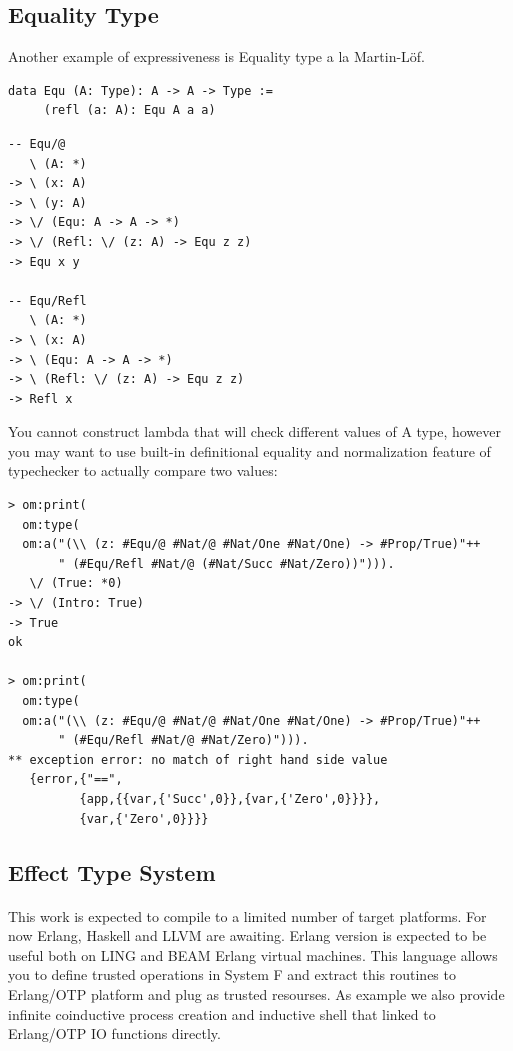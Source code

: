 \documentclass[11pt,oneside]{article}
\begin{document}
\newpage
\subsection{Equality Type}

Another example of expressiveness is Equality type a la Martin-Löf.

\begin{lstlisting}[mathescape=true]
data Equ (A: Type): A -> A -> Type :=
     (refl (a: A): Equ A a a)
\end{lstlisting}

\begin{lstlisting}[mathescape=true]
-- Equ/@
   \ (A: *)
-> \ (x: A)
-> \ (y: A)
-> \/ (Equ: A -> A -> *)
-> \/ (Refl: \/ (z: A) -> Equ z z)
-> Equ x y

-- Equ/Refl
   \ (A: *)
-> \ (x: A)
-> \ (Equ: A -> A -> *)
-> \ (Refl: \/ (z: A) -> Equ z z)
-> Refl x
\end{lstlisting}

You cannot construct lambda that will check different values of A type,
however you may want to use built-in definitional equality and
normalization feature of typechecker to actually compare two values:

\begin{lstlisting}[mathescape=true]
> om:print(
  om:type(
  om:a("(\\ (z: #Equ/@ #Nat/@ #Nat/One #Nat/One) -> #Prop/True)"++
       " (#Equ/Refl #Nat/@ (#Nat/Succ #Nat/Zero))"))).
   \/ (True: *0)
-> \/ (Intro: True)
-> True
ok

> om:print(
  om:type(
  om:a("(\\ (z: #Equ/@ #Nat/@ #Nat/One #Nat/One) -> #Prop/True)"++
       " (#Equ/Refl #Nat/@ #Nat/Zero)"))).
** exception error: no match of right hand side value
   {error,{"==",
          {app,{{var,{'Succ',0}},{var,{'Zero',0}}}},
          {var,{'Zero',0}}}}
\end{lstlisting}

\newpage
\subsection{Effect Type System}

\paragraph{}
This work is expected to compile to a limited number of target platforms. For now Erlang, Haskell and LLVM are awaiting.
Erlang version is expected to be useful both on LING and BEAM Erlang virtual machines. This language
allows you to define trusted operations in System F and extract this routines to Erlang/OTP platform
and plug as trusted resourses. As example we also provide infinite coinductive process creation
and inductive shell that linked to Erlang/OTP IO functions directly.
\end{document}
